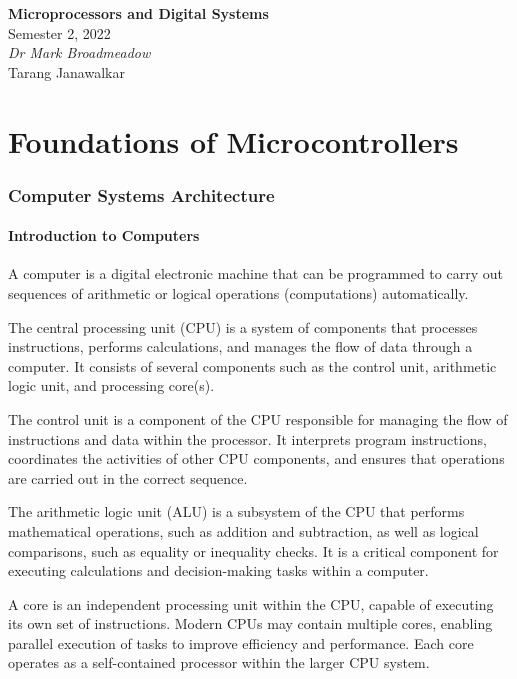 \documentclass{article}
\date{}
\newcommand{\unitName}{Microprocessors and Digital Systems}
\newcommand{\unitTime}{Semester 2, 2022}
\newcommand{\unitCoordinator}{Dr Mark Broadmeadow}
\newcommand{\documentAuthors}{Tarang Janawalkar}
\begin{document}
%
\begin{titlepage}
    \vspace*{\fill}
    \begin{center}
        \LARGE{\textbf{\unitName}} \\[0.1in]
        \normalsize{\unitTime} \\[0.2in]
        \normalsize\textit{\unitCoordinator} \\[0.2in]
        \documentAuthors
    \end{center}
    \vspace*{\fill}
    \doclicenseThis
    \thispagestyle{empty}
\end{titlepage}
\newpage
%
\tableofcontents
\newpage
%
\part{Foundations of Microcontrollers}
\section{Computer Systems Architecture}
\subsection{Introduction to Computers}
\begin{definition}[Computer]
    A computer is a digital electronic machine that can be programmed to
    carry out sequences of arithmetic or logical operations
    (computations) automatically.
\end{definition}
\begin{definition}
    The central processing unit (CPU) is a system of components that
    processes instructions, performs calculations, and manages the flow
    of data through a computer. It consists of several components such
    as the control unit, arithmetic logic unit, and processing core(s).
\end{definition}
\begin{definition}
    The control unit is a component of the CPU responsible for managing
    the flow of instructions and data within the processor. It
    interprets program instructions, coordinates the activities of other
    CPU components, and ensures that operations are carried out in the
    correct sequence.
\end{definition}
\begin{definition}
    The arithmetic logic unit (ALU) is a subsystem of the CPU that
    performs mathematical operations, such as addition and subtraction,
    as well as logical comparisons, such as equality or inequality
    checks. It is a critical component for executing calculations and
    decision-making tasks within a computer.
\end{definition}
\begin{definition}
    A core is an independent processing unit within the CPU, capable of
    executing its own set of instructions. Modern CPUs may contain
    multiple cores, enabling parallel execution of tasks to improve
    efficiency and performance. Each core operates as a self-contained
    processor within the larger CPU system.
\end{definition}
\end{document}
